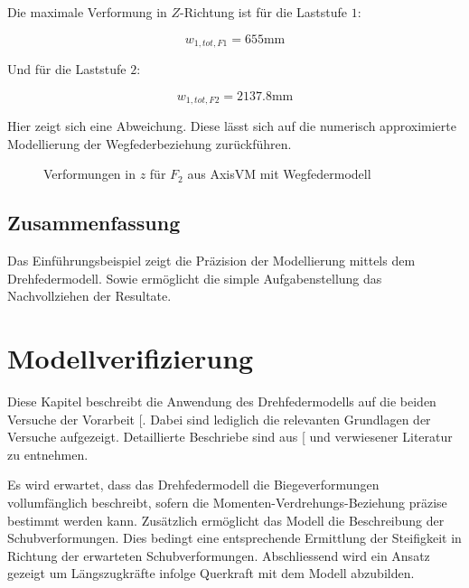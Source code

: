 \documentclass[
  11pt,
  letterpaper,
]{scrreprt}
\begin{document}
Die maximale Verformung in \(Z\)-Richtung ist für die Laststufe \(1\):

\[
w_{1,tot,F1} = 655 \text{mm}
\]

Und für die Laststufe \(2\):

\[
w_{1,tot,F2} = 2137.8 \text{mm}
\]

Hier zeigt sich eine Abweichung. Diese lässt sich auf die numerisch
approximierte Modellierung der Wegfederbeziehung zurückführen.

\begin{figure}[H]


\caption{\label{fig-f2-wegfeder}Verformungen in \(z\) für \(F_2\) aus
AxisVM mit Wegfedermodell}

\end{figure}%

\section{Zusammenfassung}\label{zusammenfassung}

Das Einführungsbeispiel zeigt die Präzision der Modellierung mittels dem
Drehfedermodell. Sowie ermöglicht die simple Aufgabenstellung das
Nachvollziehen der Resultate.


\chapter{Modellverifizierung}\label{sec-verifizierung}

Diese Kapitel beschreibt die Anwendung des Drehfedermodells auf die
beiden Versuche der Vorarbeit {[}\citeproc{ref-gitz_ansatze_2024}{1}{]}.
Dabei sind lediglich die relevanten Grundlagen der Versuche aufgezeigt.
Detaillierte Beschriebe sind aus
{[}\citeproc{ref-gitz_ansatze_2024}{1}{]} und verwiesener Literatur zu
entnehmen.

Es wird erwartet, dass das Drehfedermodell die Biegeverformungen
vollumfänglich beschreibt, sofern die Momenten-Verdrehungs-Beziehung
präzise bestimmt werden kann. Zusätzlich ermöglicht das Modell die
Beschreibung der Schubverformungen. Dies bedingt eine entsprechende
Ermittlung der Steifigkeit in Richtung der erwarteten Schubverformungen.
Abschliessend wird ein Ansatz gezeigt um Längszugkräfte infolge
Querkraft mit dem Modell abzubilden.
\end{document}
